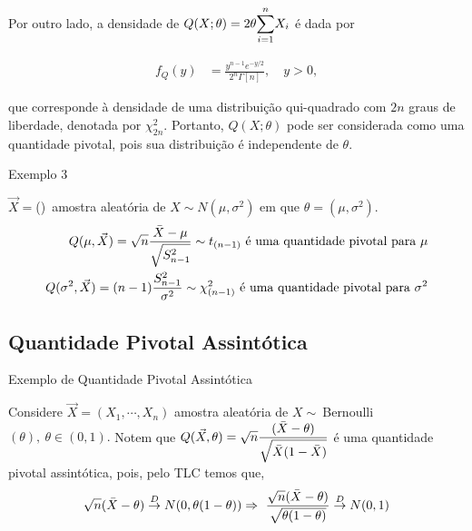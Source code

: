 \documentclass[12pt]{beamer}
\begin{document}
\begin{frame}{}
\begin{block}{}
\justifying
Por outro lado, a densidade de $Q(X;\theta) = 2\theta{\displaystyle \sum_{i=1}^{n}} X_i$ é dada por

\begin{align}
f_Q(y) &= \frac{y^{n-1}e^{-y/2}}{2^n\Gamma[n]}, \quad y > 0,
\end{align}

que corresponde à densidade de uma distribuição qui-quadrado com $2n$ graus de liberdade, denotada por $\chi^2_{2n}$. Portanto, $Q(X;\theta)$ pode ser considerada como uma quantidade pivotal, pois sua distribuição é independente de $\theta$. 
\end{block}
\end{frame}

\begin{frame}{Exemplo 3}
\begin{block}{}
\justifying
$\Vec{X}=$(\seqX)~amostra aleatória de $X\sim N(\mu,\sigma^{2})$ em que $\theta=(\mu,\sigma^{2}).$
\begin{align*}
    Q(\mu,\Vec{X})=\sqrt{n}\dfrac{\Bar{X}-\mu}{\sqrt{S^{2}_{n-1}}}\sim t_{(n-1)}~\text{é uma quantidade pivotal para}~\mu\\
     Q(\sigma^{2},\Vec{X})=(n-1)\dfrac{S_{n-1}^{2}}{\sigma^{2}}\sim \chi_{(n-1)}^{2}~\text{é uma quantidade pivotal para}~\sigma^{2}\\
\end{align*}
\end{block}
\end{frame}

\subsection{Quantidade Pivotal Assintótica}
\begin{frame}{Exemplo de Quantidade Pivotal Assintótica}
\begin{block}{}
\justifying
Considere $\Vec{X}=(X_{1},\cdots, X_{n})$ amostra aleatória de $X\sim~$Bernoulli$(\theta),~\theta\in(0,1).$ Notem que $Q(\Vec{X},\theta)=\sqrt{n}\dfrac{(\Bar{X}-\theta)}{\sqrt{\Bar{X}(1-\Bar{X})}}$ é uma quantidade pivotal assintótica, pois, pelo TLC temos que, $$\sqrt{n}(\Bar{X}-\theta)\overset{D}{\rightarrow} N(0,\theta(1-\theta))\Rightarrow~\dfrac{\sqrt{n}(\Bar{X}-\theta)}{\sqrt{\theta(1-\theta)}}\overset{D}{\rightarrow} N(0,1)$$
\end{block}
\end{frame}
\end{document}
